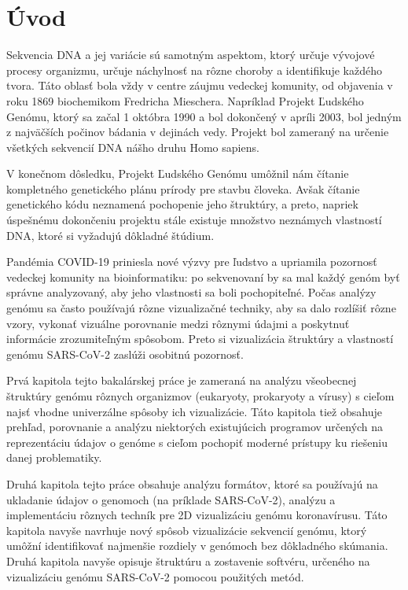 
{}

\chapter*{Úvod}

Sekvencia DNA a jej variácie sú samotným aspektom, ktorý určuje vývojové procesy organizmu, určuje náchylnosť na rôzne choroby a identifikuje každého tvora. 
Táto oblasť bola vždy v centre záujmu vedeckej komunity, od objavenia v roku 1869 biochemikom Fredricha Mieschera.
Napríklad Projekt Ľudského Genómu, ktorý sa začal 1 októbra 1990 a bol dokončený v apríli 2003, bol jedným z najväčších počinov bádania v dejinách vedy. 
Projekt bol zameraný na určenie všetkých sekvencií DNA nášho druhu Homo sapiens. 

V konečnom dôsledku, Projekt Ľudského Genómu umôžnil nám čítanie kompletného genetického plánu prírody pre stavbu človeka.
Avšak čítanie genetického kódu neznamená pochopenie jeho štruktúry, a preto, napriek úspešnému dokončeniu projektu stále existuje množstvo neznámych vlastností DNA, ktoré si vyžadujú dôkladné štúdium.

Pandémia COVID-19 priniesla nové výzvy pre ľudstvo a upriamila pozornosť vedeckej komunity na bioinformatiku: po sekvenovaní by sa mal každý genóm byť správne analyzovaný, aby jeho vlastnosti sa boli pochopiteľné.
Počas analýzy genómu sa často používajú rôzne vizualizačné techniky, aby sa dalo rozlíšiť rôzne vzory, vykonať vizuálne porovnanie medzi rôznymi údajmi a poskytnuť informácie zrozumiteľným spôsobom.
Preto si vizualizácia štruktúry a vlastností genómu SARS-CoV-2 zaslúži osobitnú pozornosť.

Prvá kapitola tejto bakalárskej práce je zameraná na analýzu všeobecnej štruktúry genómu rôznych organizmov (eukaryoty, prokaryoty a vírusy) s cieľom najsť vhodne univerzálne spôsoby ich vizualizácie.
Táto kapitola tiež obsahuje prehľad, porovnanie a analýzu niektorých existujúcich programov určených na reprezentáciu údajov o genóme s cieľom pochopiť moderné prístupy ku riešeniu danej problematiky.

Druhá kapitola tejto práce obsahuje analýzu formátov, ktoré sa používajú na ukladanie údajov o genomoch (na príklade SARS-CoV-2), analýzu a implementáciu rôznych techník pre 2D vizualizáciu genómu koronavírusu.
Táto kapitola navyše navrhuje nový spôsob vizualizácie sekvencií genómu, ktorý umôžní identifikovať najmenšie rozdiely v genómoch bez dôkladného skúmania.
Druhá kapitola navyše opisuje štruktúru a zostavenie softvéru, určeného na vizualizáciu genómu SARS-CoV-2 pomocou použitých metód.

